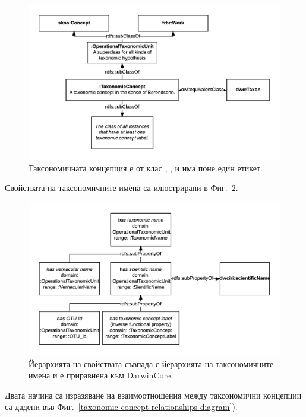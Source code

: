 \begin{figure}[h!]
\centering
  \includegraphics[width=\textwidth]{Figures/taxonomic-concept-diagram}
  \decoRule
  \caption[Taxonomic concept diagram.]{
  Таксономичната концепция е от клас , ,  и има поне един етикет.}
  \label{taxonomic-concept-diagram}
\end{figure}

Свойствата на таксономичните имена са илюстрирани в Фиг.~\ref{name-property-hierarchy}.

\begin{figure}[h!]
\centering
  \includegraphics[width=\textwidth]{Figures/name-property-hierarchy}
  \decoRule
  \caption[axonomic name property hierarchy diagram.]
  {Йерархията на свойствата съвпада с йерархията на таксономичните имена и е приравнена към DarwinCore.}
  \label{name-property-hierarchy}
\end{figure}

Двата начина са изразяване на взаимоотношения между таксономични концепции са дадени във Фиг.~\ref{taxonomic-concept-relationships-diagram}).

